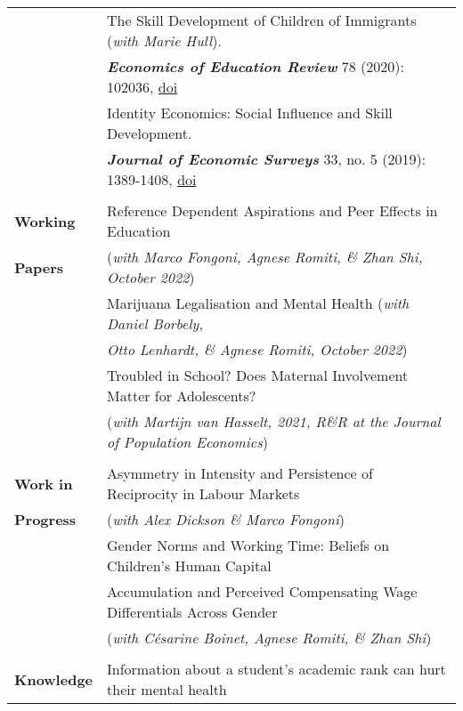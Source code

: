 \documentclass[11pt,a4paper]{article}
\begin{document}
\begin{longtable}{l l}
\addlinespace						
																				&  The Skill Development of Children of Immigrants (\textit{with Marie Hull}).  \\ 
																				&  \textbf{\textit{Economics of Education Review}} 78 (2020): 102036, \href{https://doi.org/10.1016/j.econedurev.2020.102036}{doi}    \\			
\addlinespace
																				&  Identity Economics: Social Influence and Skill Development.     \\
																				&  \textbf{\textit{Journal of Economic Surveys}} 33, no. 5 (2019): 1389-1408, \href{ https://doi.org/10.1111/joes.12331}{doi}		\\			
																				&   \\
\textbf{Working} 							  &  Reference Dependent Aspirations and Peer Effects in Education  \\ 
\textbf{Papers}										&  (\textit{with Marco Fongoni, Agnese Romiti, \& Zhan Shi, October 2022})   \\
\addlinespace
																							& Marijuana Legalisation and Mental Health (\textit{with Daniel Borbely,}  \\ 
																							& \textit{Otto Lenhardt, \& Agnese Romiti, October 2022})   \\
\addlinespace
																							&  Troubled in School? Does Maternal Involvement Matter for Adolescents?  \\
																							&  (\textit{with Martijn van Hasselt, 2021, R\&R at the Journal of Population Economics})  \\
																							&  \\
\textbf{Work in} 									&  Asymmetry in Intensity and Persistence of Reciprocity in Labour Markets  \\ 
\textbf{Progress}								&  (\textit{with Alex Dickson \& Marco Fongoni})   \\
\addlinespace										
																							&  Gender Norms and Working Time: Beliefs on Children's Human Capital  \\ 
																							&  Accumulation and Perceived Compensating Wage Differentials Across Gender    \\
																							& (\textit{with C\'esarine Boinet, Agnese Romiti, \& Zhan Shi})  \\
																							&      \\
\textbf{Knowledge}                      &  Information about a student’s academic rank can hurt their mental health  \\ 

\end{longtable}
\end{document}
